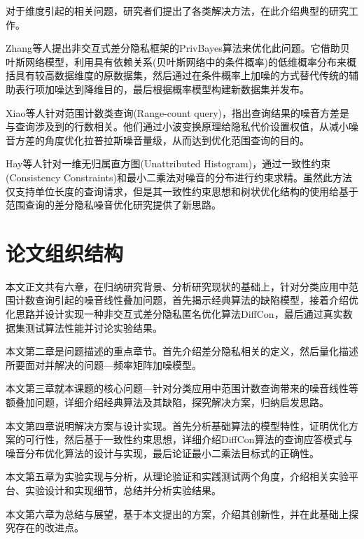 对于维度引起的相关问题，研究者们提出了各类解决方法，在此介绍典型的研究工作。

Zhang\supercite{privbayes}等人提出非交互式差分隐私框架的PrivBayes算法来优化此问题。它借助贝叶斯网络模型，利用具有依赖关系(贝叶斯网络中的条件概率)的低维概率分布来概括具有较高数据维度的原数据集，然后通过在条件概率上加噪的方式替代传统的辅助表行项加噪达到降维目的，最后根据概率模型构建新数据集并发布。

Xiao\supercite{wavelet}等人针对范围计数类查询(Range-count query)，指出查询结果的噪音方差是与查询涉及到的行数相关。他们通过小波变换原理给隐私代价设置权值，从减小噪音方差的角度优化拉普拉斯噪音量级，从而达到优化范围查询的目的。

Hay\supercite{boosting}等人针对一维无归属直方图(Unattributed Histogram)，通过一致性约束(Consistency Constraints)和最小二乘法对噪音的分布进行约束求精。虽然此方法仅支持单位长度的查询请求，但是其一致性约束思想和树状优化结构的使用给基于范围查询的差分隐私噪音优化研究提供了新思路。

\section{论文组织结构}

本文正文共有六章，在归纳研究背景、分析研究现状的基础上，针对分类应用中范围计数查询引起的噪音线性叠加问题，首先揭示经典算法的缺陷模型，接着介绍优化思路并设计实现一种非交互式差分隐私匿名优化算法DiffCon，最后通过真实数据集测试算法性能并讨论实验结果。

本文第二章是问题描述的重点章节。首先介绍差分隐私相关的定义，然后量化描述所要面对并解决的问题---频率矩阵加噪模型。

本文第三章就本课题的核心问题---针对分类应用中范围计数查询带来的噪音线性等额叠加问题，详细介绍经典算法及其缺陷，探究解决方案，归纳启发思路。

本文第四章说明解决方案与设计实现。首先分析基础算法的模型特性，证明优化方案的可行性，然后基于一致性约束思想，详细介绍DiffCon算法的查询应答模式与噪音分布优化算法的设计与实现，最后论证最小二乘法目标式的正确性。

本文第五章为实验实现与分析，从理论验证和实践测试两个角度，介绍相关实验平台、实验设计和实现细节，总结并分析实验结果。

本文第六章为总结与展望，基于本文提出的方案，介绍其创新性，并在此基础上探究存在的改进点。